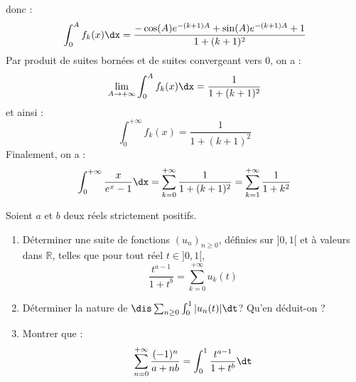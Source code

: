 \documentclass[a4paper,10pt]{report}
\begin{document}
donc :
$$\int_0^A f_k(x) \dx = \dfrac{-\cos(A)e^{-(k+1)A}+ \sin(A)e^{-(k+1)A}+1}{1+(k+1)^2}$$
Par produit de suites bornées et de suites convergeant vers $0$, on a :
$$ \lim_{A \rightarrow + \infty} \int_0^A f_k(x) \dx = \dfrac{1}{1+(k+1)^2}$$
et ainsi :
$$ \int_0^{+ \infty} f_k(x)  = \dfrac{1}{1+(k+1)^2}$$
Finalement, on a :
$$ \int_0^{+ \infty} \dfrac{x}{e^x-1} \dx = \sum_{k=0}^{+ \infty} \dfrac{1}{1+(k+1)^2} =  \sum_{k=1}^{+ \infty} \dfrac{1}{1+k^2}$$

\begin{Exercice}{} Soient $a$ et $b$ deux réels strictement positifs.
\begin{enumerate}
\item Déterminer une suite de fonctions $(u_n)_{n \geq 0}$, définies sur $]0,1[$ et à valeurs dans $\mathbb{R}$, telles que pour tout réel $t \in ]0,1[$,
$$ \dfrac{t^{a-1}}{1+t^b} = \sum_{k=0}^{+ \infty} u_k(t)$$
\item Déterminer la nature de $\dis \sum_{n \geq 0} \int_0^1 \vert u_n(t) \vert \dt$? Qu'en déduit-on ?
\item Montrer que :
$$ \sum_{n=0}^{+ \infty} \dfrac{(-1)^n}{a+nb} = \int_0^1 \dfrac{t^{a-1}}{1+t^b} \dt$$
\end{enumerate}
\end{Exercice}

\corr 
\end{document}
